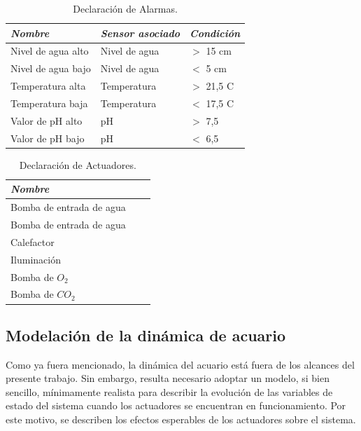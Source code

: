 \begin{table}[ht]
	\centering
	\caption{Declaración de Alarmas.}
	\begin{tabular}{@{} l l l@{}}    \toprule
		\emph{\textbf{Nombre}} & \emph{\textbf{Sensor asociado}} & \emph{\textbf{Condición}}  \\\midrule
		Nivel de agua alto	& Nivel de agua 	& $>$ 15 cm\\		
		Nivel de agua bajo	& Nivel de agua	& $<$ 5 cm\\
		Temperatura alta		& Temperatura	& $>$ 21,5 \grados C\\
		Temperatura baja		& Temperatura	& $<$ 17,5 \grados C\\
		Valor de pH alto		& pH				& $>$ 7,5\\ 
		Valor de pH bajo		& pH 			& $<$ 6,5\\	 \bottomrule
		\hline
	\end{tabular}
	\label{tab:alarmas}
\end{table}


\begin{table}[ht]
	\centering
	\caption{Declaración de Actuadores.}
	\begin{tabular}{@{} l *2c @{}}    \toprule
		\emph{\textbf{Nombre}} 	&  &   \\\midrule
		Bomba de entrada de agua	&  	& \\		
		Bomba de entrada de agua	&	& \\
		Calefactor				&	& \\
		Iluminación				& 	& \\
		Bomba de $O_2$			& 	& \\ 
		Bomba de $CO_2$			&  	& \\	 \bottomrule
		\hline
	\end{tabular}
	\label{tab:actuadores}
\end{table}



\subsection{Modelación de la dinámica de acuario}

Como ya fuera mencionado, la dinámica del acuario está fuera de los alcances del presente trabajo. Sin embargo, resulta necesario adoptar un modelo, si bien sencillo, mínimamente realista para describir la evolución de las variables de estado del sistema cuando los actuadores se encuentran en funcionamiento. Por este motivo, se describen los efectos esperables de los actuadores sobre el sistema.

